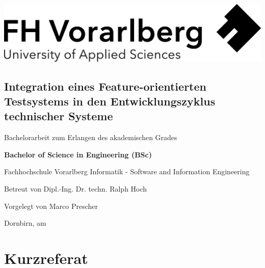 \documentclass[a4paper, fontsize=11pt, parskip=half, twoside]{scrreprt}
\date{\displaydate{date}}
\begin{document}
	
	\thispagestyle{empty}
	
	\cleardoublepage   %
	\thispagestyle{empty}
	\begin{titlepage}
		\begin{flushright}
			\includegraphics[width=0.4\linewidth]{assets/Logo-A3.jpg}
		\end{flushright}
		
		\begin{flushleft}
			\section*{Integration eines Feature-orientierten Testsystems in den Entwicklungszyklus technischer Systeme}
			\vspace{1cm}
			
			\vspace{0.5cm}
			Bachelorarbeit\newline
			zum Erlangen des akademischen Grades\newline
			
			\vspace{0.5cm}
			\textbf{Bachelor of Science in Engineering (BSc)}
			
			\vspace{1cm}
			Fachhochschule Vorarlberg\newline
			Informatik - Software and Information Engineering\newline
			
			\vspace{0.5cm}
			Betreut von\newline
			Dipl.-Ing. Dr. techn. Ralph Hoch
			
			\vspace{0.5cm} 
			Vorgelegt von\newline
			Marco Prescher	
			
			\vspace{0.5cm}
			Dornbirn, am 
		\end{flushleft}
	\end{titlepage}
	
	\newpage
	\section*{Kurzreferat}
\end{document}
